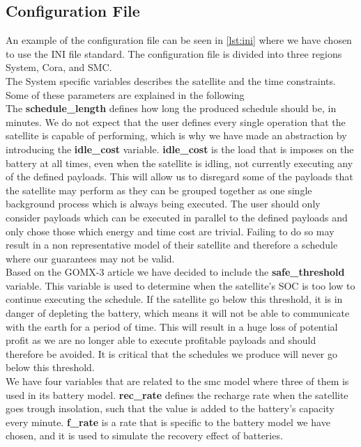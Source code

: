 \subsection{Configuration File} \label{subsec:init}
An example of the configuration file can be seen in \cref{lst:ini} where we have chosen to use the INI file standard. The configuration file is divided into three regions System, Cora, and SMC.\\
The System specific variables describes the satellite and the time constraints. Some of these parameters are explained in the following\\
The \textbf{schedule\_length} defines how long the produced schedule should be, in minutes.
We do not expect that the user defines every single operation that the satellite is capable of performing, which is why we have made an abstraction by introducing the \textbf{idle\_cost} variable. 
\textbf{idle\_cost} is the load that is imposes on the battery at all times, even when the satellite is idling, not currently executing any of the defined payloads.
This will allow us to disregard some of the payloads that the satellite may perform as they can be grouped together as one single background process which is always being executed.
The user should only consider payloads which can be executed in parallel to the defined payloads and only chose those which energy and time cost are trivial.
Failing to do so may result in a non representative model of their satellite and therefore a schedule where our guarantees may not be valid.\\
Based on the GOMX-3 article\cite{gomx3} we have decided to include the \textbf{safe\_threshold} variable.
This variable is used to determine when the satellite's SOC is too low to continue executing the schedule.
If the satellite go below this threshold, it is in danger of depleting the battery, which means it will not be able to communicate with the earth for a period of time.
This will result in a huge loss of potential profit as we are no longer able to execute profitable payloads and should therefore be avoided.
It is critical that the schedules we produce will never go below this threshold.\\
We have four variables that are related to the \gls{smc} model where three of them is used in its battery model.
\textbf{rec\_rate} defines the recharge rate when the satellite goes trough insolation, such that the value is added to the battery's capacity every minute.
\textbf{f\_rate} is a rate that is specific to the battery model we have chosen, and it is used to simulate the recovery effect of batteries.
